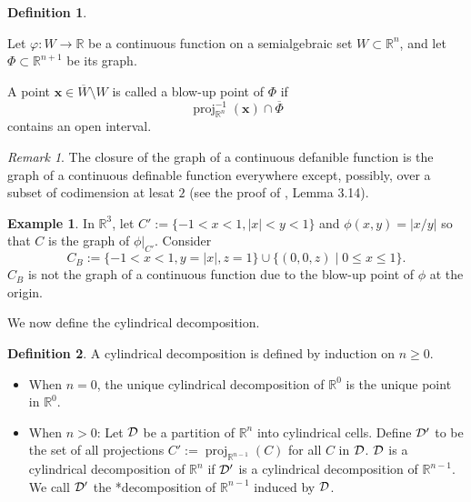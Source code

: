 \documentclass[
]{book}
\theoremstyle{definition}
\newtheorem{definition}{Definition}[chapter]
\theoremstyle{definition}
\newtheorem{example}{Example}[chapter]
\theoremstyle{definition}
\theoremstyle{definition}
\theoremstyle{remark}
\newtheorem*{remark}{Remark}
\begin{document}
\begin{definition}
\protect\hypertarget{def:blow-up-point}{}\label{def:blow-up-point}\citep[Definition 9.2]{bgv15}

Let \(\varphi : W \to \mathbb{R}\) be a continuous function on a semialgebraic set \(W \subset \mathbb{R}^n\), and let \(\Phi \subset \mathbb{R}^{n+1}\) be its graph.

A point \(\mathbf{x} \in \overline{W} \setminus W\) is called a blow-up point of \(\Phi\) if \[\operatorname{proj}^{-1}_{\mathbb{R}^n} (\mathbf{x}) \cap \overline{\Phi}\] contains an open interval.
\end{definition}

\begin{remark}
The closure of the graph of a continuous defanible function is the graph of a continuous definable function everywhere except, possibly, over a subset of codimension at lesat \(2\) (see the proof of \citet{bgv15}, Lemma 3.14).
\end{remark}

\begin{example}
\protect\hypertarget{exm:top-bottom-not-cylindrical}{}\label{exm:top-bottom-not-cylindrical}In \(\mathbb{R}^3\), let \(C' := \{ -1 < x < 1, \vert x \vert < y < 1 \}\) and \(\phi(x,y) = \vert x / y \vert\) so that \(C\) is the graph of \(\phi\vert_{C'}\).
Consider \[
C_B := \{ -1 < x < 1, y = \vert x \vert, z = 1 \} \cup \{ (0,0,z) \mid 0 \le x \le 1 \}.
\]
\(C_B\) is not the graph of a continuous function due to the blow-up point of \(\phi\) at the origin.
\end{example}

We now define the cylindrical decomposition.

\begin{definition}

A cylindrical decomposition is defined by induction on \(n \ge 0\).

\begin{itemize}
\item
  When \(n = 0\), the unique cylindrical decomposition of \(\mathbb{R}^0\) is the unique point in \(\mathbb{R}^0\).
\item
  When \(n > 0\): Let \(\cal D\) be a partition of \(\mathbb{R}^n\) into cylindrical cells.
  Define \(\cal D'\) to be the set of all projections \(C' := {\operatorname{proj}_{\mathbb{R}^{n-1}}}(C)\) for all \(C\) in \(\cal D\).
  \(\cal D\) is a cylindrical decomposition of \(\mathbb{R}^n\) if \(\cal D'\) is a cylindrical decomposition of \(\mathbb{R}^{n-1}\). We call \(\cal D'\) the *decomposition of \(\mathbb{R}^{n-1}\) induced by \(\cal D\).
\end{itemize}

\end{definition}
\end{document}
